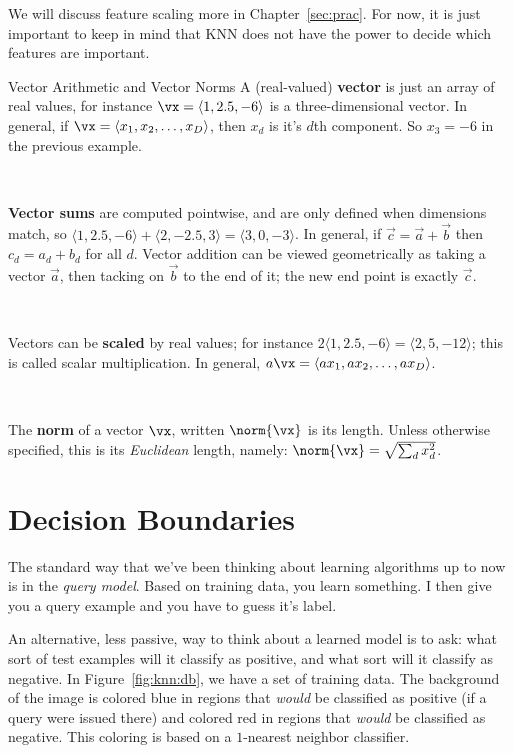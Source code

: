 \MoveNextFigure{-5cm}


We will discuss feature scaling more in Chapter~\ref{sec:prac}.  For
now, it is just important to keep in mind that KNN does not have the
power to decide which features are important.

\begin{mathreview}{Vector Arithmetic and Vector Norms}
  A (real-valued) \textbf{vector} is just an array of real values, for
  instance $\vx = \langle 1, 2.5, -6 \rangle$ is a three-dimensional
  vector. In general, if $\vx = \langle x_1, x_2, \dots, x_D \rangle$,
  then $x_d$ is it's $d$th component. So $x_3 = -6$ in the previous
  example.

~

  \textbf{Vector sums} are computed pointwise, and are only defined when
  dimensions match, so $\langle 1, 2.5, -6 \rangle + \langle 2, -2.5,
  3 \rangle = \langle 3, 0, -3 \rangle$. In general, if $\vec c = \vec
  a + \vec b$ then $c_d = a_d + b_d$ for all $d$. Vector addition can
  be viewed geometrically as taking a vector $\vec a$, then tacking on
  $\vec b$ to the end of it; the new end point is exactly $\vec c$.

~

  Vectors can be \textbf{scaled} by real values; for instance $2
  \langle 1, 2.5, -6 \rangle = \langle 2, 5, -12 \rangle$; this is
  called scalar multiplication. In general, $a \vx = \langle a x_1, a
  x_2, \dots, a x_D \rangle$.

~

  The \textbf{norm} of a vector $\vx$, written $\norm{\vx}$ is its
  length. Unless otherwise specified, this is its \emph{Euclidean}
  length, namely: $\norm{\vx} = \sqrt{\sum_d x_d^2}$.
\end{mathreview}

\section{Decision Boundaries}

The standard way that we've been thinking about learning algorithms up
to now is in the \emph{query model}.  Based on training data, you
learn something.  I then give you a query example and you have to
guess it's label.


An alternative, less passive, way to think about a learned model is to
ask: what sort of test examples will it classify as positive, and what
sort will it classify as negative.  In Figure~\ref{fig:knn:db}, we have a
set of training data.  The background of the image is colored blue in
regions that \emph{would} be classified as positive (if a query were
issued there) and colored red in regions that \emph{would} be
classified as negative.  This coloring is based on a $1$-nearest
neighbor classifier.

